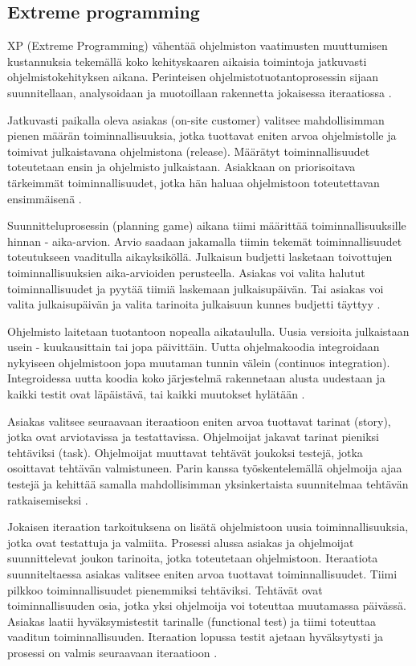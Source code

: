 \documentclass[finnish]{tktltiki2}
\theoremstyle{definition}
\theoremstyle{remark}
\begin{document}
\subsection{Extreme programming}

XP (Extreme Programming) vähentää ohjelmiston vaatimusten muuttumisen kustannuksia tekemällä koko kehityskaaren aikaisia toimintoja jatkuvasti ohjelmistokehityksen aikana. Perinteisen ohjelmistotuotantoprosessin sijaan suunnitellaan, analysoidaan ja muotoillaan rakennetta jokaisessa iteraatiossa \cite{BEC99}.

Jatkuvasti paikalla oleva asiakas (on-site customer) valitsee mahdollisimman pienen määrän toiminnallisuuksia, jotka tuottavat eniten arvoa ohjelmistolle ja toimivat julkaistavana ohjelmistona (release). Määrätyt toiminnallisuudet toteutetaan ensin ja ohjelmisto julkaistaan. Asiakkaan on priorisoitava tärkeimmät toiminnallisuudet, jotka hän haluaa ohjelmistoon toteutettavan ensimmäisenä \cite{BEC99}.

Suunnitteluprosessin (planning game) aikana tiimi määrittää toiminnallisuuksille hinnan - aika-arvion. Arvio saadaan jakamalla tiimin tekemät toiminnallisuudet toteutukseen vaaditulla aikayksiköllä. Julkaisun budjetti lasketaan toivottujen toiminnallisuuksien aika-arvioiden perusteella. Asiakas voi valita halutut toiminnallisuudet ja pyytää tiimiä laskemaan julkaisupäivän. Tai asiakas voi valita julkaisupäivän ja valita tarinoita julkaisuun kunnes budjetti täyttyy \cite{BEC99}.

Ohjelmisto laitetaan tuotantoon nopealla aikataululla. Uusia versioita julkaistaan usein - kuukausittain tai jopa päivittäin. Uutta ohjelmakoodia integroidaan nykyiseen ohjelmistoon jopa muutaman tunnin välein (continuos integration). Integroidessa uutta koodia koko järjestelmä rakennetaan alusta uudestaan ja kaikki testit ovat läpäistävä, tai kaikki muutokset hylätään \cite{BEC99}.

Asiakas valitsee seuraavaan iteraatioon eniten arvoa tuottavat tarinat (story), jotka ovat arviotavissa ja testattavissa. Ohjelmoijat jakavat tarinat pieniksi tehtäviksi (task). Ohjelmoijat muuttavat tehtävät joukoksi testejä, jotka osoittavat tehtävän valmistuneen. Parin kanssa työskentelemällä ohjelmoija ajaa testejä ja kehittää samalla mahdollisimman yksinkertaista suunnitelmaa tehtävän ratkaisemiseksi \cite{BEC99}.  

Jokaisen iteraation tarkoituksena on lisätä ohjelmistoon uusia toiminnallisuuksia, jotka ovat testattuja ja valmiita. Prosessi alussa asiakas ja ohjelmoijat suunnittelevat joukon tarinoita, jotka toteutetaan ohjelmistoon. Iteraatiota suunniteltaessa asiakas valitsee eniten arvoa tuottavat toiminnallisuudet. Tiimi pilkkoo toiminnallisuudet pienemmiksi tehtäviksi. Tehtävät ovat toiminnallisuuden osia, jotka yksi ohjelmoija voi toteuttaa muutamassa päivässä. Asiakas laatii hyväksymistestit tarinalle (functional test) ja tiimi toteuttaa vaaditun toiminnallisuuden. Iteraation lopussa testit ajetaan hyväksytysti ja prosessi on valmis seuraavaan iteraatioon \cite{BEC99}.
\end{document}
